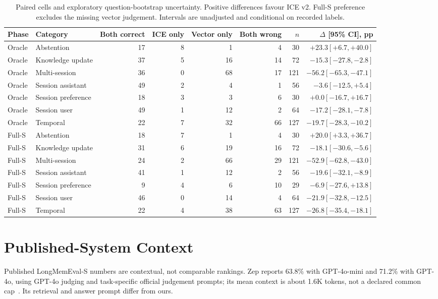 \documentclass[11pt]{article}
\begin{document}
\begin{table}[t]
\centering\small
\begin{tabular}{@{}llrrrrrr@{}}
\toprule
Phase & Category & Both correct & ICE only & Vector only & Both wrong & $n$ & $\Delta$ [95\% CI], pp\\\midrule
Oracle & Abstention & 17 & 8 & 1 & 4 & 30 & $+23.3 [+6.7,+40.0]$ \\
Oracle & Knowledge update & 37 & 5 & 16 & 14 & 72 & $-15.3 [-27.8,-2.8]$ \\
Oracle & Multi-session & 36 & 0 & 68 & 17 & 121 & $-56.2 [-65.3,-47.1]$ \\
Oracle & Session assistant & 49 & 2 & 4 & 1 & 56 & $-3.6 [-12.5,+5.4]$ \\
Oracle & Session preference & 18 & 3 & 3 & 6 & 30 & $+0.0 [-16.7,+16.7]$ \\
Oracle & Session user & 49 & 1 & 12 & 2 & 64 & $-17.2 [-28.1,-7.8]$ \\
Oracle & Temporal & 22 & 7 & 32 & 66 & 127 & $-19.7 [-28.3,-10.2]$ \\
Full-S & Abstention & 18 & 7 & 1 & 4 & 30 & $+20.0 [+3.3,+36.7]$ \\
Full-S & Knowledge update & 31 & 6 & 19 & 16 & 72 & $-18.1 [-30.6,-5.6]$ \\
Full-S & Multi-session & 24 & 2 & 66 & 29 & 121 & $-52.9 [-62.8,-43.0]$ \\
Full-S & Session assistant & 41 & 1 & 12 & 2 & 56 & $-19.6 [-32.1,-8.9]$ \\
Full-S & Session preference & 9 & 4 & 6 & 10 & 29 & $-6.9 [-27.6,+13.8]$ \\
Full-S & Session user & 46 & 0 & 14 & 4 & 64 & $-21.9 [-32.8,-12.5]$ \\
Full-S & Temporal & 22 & 4 & 38 & 63 & 127 & $-26.8 [-35.4,-18.1]$ \\
\bottomrule\end{tabular}
\caption{Paired cells and exploratory question-bootstrap uncertainty. Positive differences favour ICE v2. Full-S preference excludes the missing vector judgement. Intervals are unadjusted and conditional on recorded labels.}
\end{table}
\section{Published-System Context}
\label{app:context}
Published LongMemEval-S numbers are contextual, not comparable rankings. Zep reports 63.8\% with GPT-4o-mini and 71.2\% with GPT-4o, using GPT-4o judging and task-specific official judgement prompts; its mean context is about 1.6K tokens, not a declared common cap~\citep{rasmussen2025zep}. Its retrieval and answer prompt differ from ours.
\end{document}
